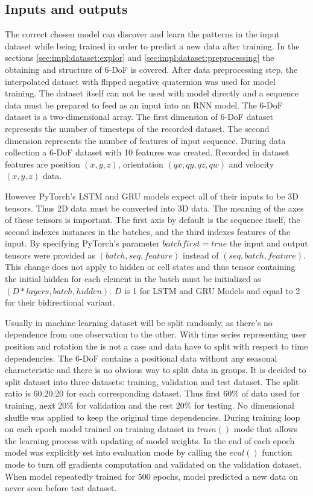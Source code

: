 \subsection{Inputs and outputs}
\label{sec:impl:model:inputs}
The correct chosen model can discover and learn the patterns in the input dataset while being trained in order to predict a new data after training. In the sections \ref{sec:impl:dataset:explor} and \ref{sec:impl:dataset:preprocessing} the obtaining and structure of 6-DoF is covered. After data preprocessing step, the interpolated dataset with flipped negative quaternion was used for model training. The dataset itself can not be used with model directly and a sequence data must be prepared to feed as an input into an RNN model. The 6-DoF dataset is a two-dimensional array. The first dimension of 6-DoF dataset represents the number of timesteps of the recorded dataset. The second dimension represents the number of features of input sequence. During data collection a 6-DoF dataset with 10 features was created. Recorded in dataset features are position $(x, y, z)$, orientation $(qx, qy, qz, qw)$ and velocity $(x, y, z)$ data. 

However PyTorch’s LSTM and GRU models expect all of their inputs to be 3D tensors. Thus 2D data must be converted into 3D data. The meaning of the axes of these tensors is important. The first axis by default is the sequence itself, the second indexes instances in the batches, and the third indexes features of the input. By specifying PyTorch's parameter $batch first = true$ the input and output tensors were provided as $(batch, seq, feature)$ instead of $(seq, batch, feature)$. This change does not apply to hidden or cell states and thus tensor containing the initial hidden for each element in the batch must be initialized as $(D * layers, batch, hidden)$. $D$ is 1 for LSTM and GRU Models and equal to 2 for their bidirectional variant. 

Usually in machine learning dataset will be split randomly, as there’s no dependence from one observation to the other. With time series representing user position and rotation the is not a case and data have to split with respect to time dependencies. The 6-DoF contains a positional data without any seasonal characteristic and there is no obvious way to split data in groups. It is decided to split dataset into three datasets: training, validation and test dataset. The split ratio is 60:20:20 for each corresponding dataset. Thus first 60\% of data used for training, next 20\% for validation and the rest 20\% for testing. No dimensional shuffle was applied to keep the original time dependencies. During training loop on each epoch model trained on training dataset in $train()$ mode that allows the learning process with updating of model weights. In the end of each epoch model was explicitly set into evaluation mode by calling the $eval()$ function mode to turn off gradients computation and validated on the validation dataset. When model repeatedly trained for 500 epochs, model predicted a new data on never seen before test dataset. 

